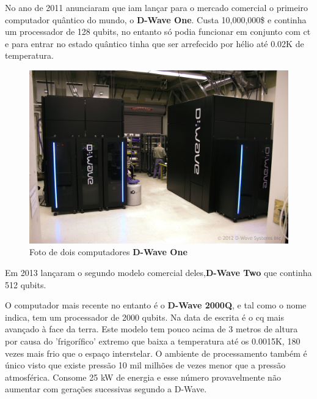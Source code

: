 \documentclass{report}
\begin{document}
	No ano de 2011 anunciaram que iam lançar para o mercado comercial o primeiro computador quântico do mundo, o \textbf{D-Wave One}. Custa 10,000,000\$ e continha um processador de 128 qubits, no entanto só podia funcionar em conjunto com \ac{ct} e para entrar no estado quântico tinha que ser arrefecido por hélio até 0.02K de temperatura.


	\begin{figure}[!h]
		\centering
		\includegraphics[scale=0.43]{dwave_ones_in_the_lab_large.jpg} 
		\caption{Foto de dois computadores \textbf{D-Wave One}}
		\label{D-Wave}
	\end{figure}	
		
	\newpage
	
	Em 2013 lançaram o segundo modelo comercial deles,\textbf{D-Wave Two} que continha 512 qubits.

	O computador mais recente no entanto é o \textbf{D-Wave 2000Q}, e tal como o nome indica, tem um processador de 2000 qubits. Na data de escrita é o \ac{cq} mais avançado à face da terra. Este modelo tem pouco acima de 3 metros de altura por causa do 'frigorífico' extremo que baixa a temperatura até os 0.0015K, 180 vezes mais frio que o espaço interstelar. O ambiente de processamento também é único visto que existe pressão 10 mil milhões de vezes menor que a pressão atmosférica. Consome 25 kW de energia e esse número provavelmente não aumentar com gerações sucessivas segundo a D-Wave.
\end{document}
